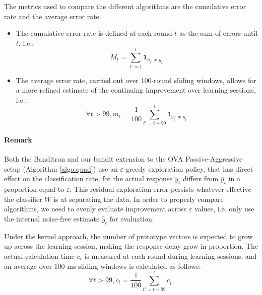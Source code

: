 \documentclass[preprint,12pt,authoryear]{elsarticle}
\begin{document}
The metrics used to compare the different algorithms are the cumulative error rate and the average error rate. 
\begin{itemize}
\item The cumulative error rate is defined at each round $t$ as the sum of errors until $t$, i.e.:
$$M_t = \sum_{t'=1}^t \mathbf{1}_{\hat{y}_{t^\prime}\neq y_{t^\prime}} $$
\item The average error rate, carried out over 100-round sliding windows, allows for a more refined estimate of the continuing improvement over learning sessions, i.e.:
$$\forall t>99, \bar{m}_t = \frac{1}{100} \sum_{t'=t - 99}^t \mathbf{1}_{\hat{y}_{t^\prime}\neq y_{t^\prime}}$$
\end{itemize}

\paragraph{Remark} Both the Banditron and our bandit extension to the OVA Passive-Aggressive setup (Algorithm \ref{algo:quad}) use an $\varepsilon$-greedy exploration policy, that has direct effect on the  classification rate, for the actual response  $\tilde{y}_t$ differs from $\hat{y}_t$ in a proportion equal to $\varepsilon$. This residual exploration error persists whatever effective the classifier $W$ is at separating the data. In order to properly compare algorithms, we need to evenly evaluate improvement across $\varepsilon$ values, i.e. only use the internal noise-free estimate $\hat{y}_t$ for evaluation.


Under the kernel approach, the number of prototype vectors is expected to grow up across the learning session, making the response delay grow in proportion. The actual calculation time $c_t$ is measured at each round during learning sessions, and an average over 100 ms sliding windows is calculated as follows:
 $$\forall t>99, \bar{c}_t = \frac{1}{100} \sum_{t'=t - 99}^t c_{t^\prime}$$
\end{document}

